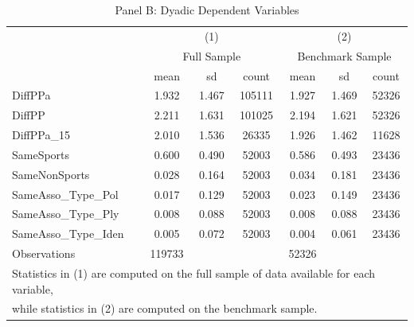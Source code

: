 \begin{table}[htbp]\centering
\def\sym#1{\ifmmode^{#1}\else\(^{#1}\)\fi}
\caption{Panel B: Dyadic Dependent Variables}
\begin{tabular}{l*{2}{ccc}}
\toprule
                    &\multicolumn{3}{c}{(1)}               &\multicolumn{3}{c}{(2)}               \\
                    &\multicolumn{3}{c}{Full Sample}       &\multicolumn{3}{c}{Benchmark Sample}  \\
                    &        mean&          sd&       count&        mean&          sd&       count\\
\midrule
DiffPPa             &       1.932&       1.467&      105111&       1.927&       1.469&       52326\\
DiffPP              &       2.211&       1.631&      101025&       2.194&       1.621&       52326\\
DiffPPa\_15          &       2.010&       1.536&       26335&       1.926&       1.462&       11628\\
SameSports          &       0.600&       0.490&       52003&       0.586&       0.493&       23436\\
SameNonSports       &       0.028&       0.164&       52003&       0.034&       0.181&       23436\\
SameAsso\_Type\_Pol   &       0.017&       0.129&       52003&       0.023&       0.149&       23436\\
SameAsso\_Type\_Ply   &       0.008&       0.088&       52003&       0.008&       0.088&       23436\\
SameAsso\_Type\_Iden  &       0.005&       0.072&       52003&       0.004&       0.061&       23436\\
\midrule
Observations        &      119733&            &            &       52326&            &            \\
\bottomrule
\multicolumn{7}{l}{\footnotesize Statistics in (1) are computed on the full sample of data available for each variable,}\\
\multicolumn{7}{l}{\footnotesize while statistics in (2) are computed on the benchmark sample.}\\
\end{tabular}
\end{table}

